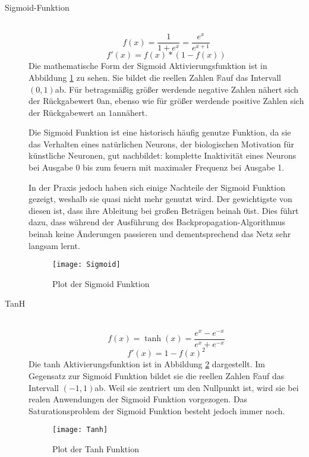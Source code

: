 \begin{description}
	\item[Sigmoid-Funktion] \hfill \\
		\begin{equation}
			f(x) = \frac{1}{1 + e^x} = \frac{e^x}{e^{x + 1}}
			\label{func:Sigmoid}
		\end{equation}
		\begin{equation}
			f'(x) = f(x) * (1 - f(x))
		\end{equation}
		Die mathematische Form der Sigmoid Aktivierungsfunktion ist in Abbildung \ref{sigmoidFunc} zu sehen.
		Sie bildet die reellen Zahlen \(\mathbb{R}\)auf das Intervall \((0,1)\)ab. 
		Für betragsmäßig größer werdende negative Zahlen nähert sich der Rückgabewert \(0\)an,
		ebenso wie für größer werdende positive Zahlen sich der Rückgabewert an \(1\)annähert.

		Die Sigmoid Funktion ist eine historisch häufig genutze Funktion, da sie das Verhalten eines natürlichen Neurons,
		der biologischen Motivation für künstliche Neuronen, gut nachbildet:
		komplette Inaktivität eines Neurons bei Ausgabe 0 bis zum feuern mit maximaler Frequenz bei Ausgabe 1.

		In der Praxis jedoch haben sich einige Nachteile der Sigmoid Funktion gezeigt, weshalb sie quasi nicht mehr genutzt wird.
		Der gewichtigste von diesen ist, dass ihre Ableitung bei großen Beträgen beinah \(0\)ist.
		Dies führt dazu, dass während der Ausführung des Backpropagation-Algorithmus beinah keine Änderungen passieren und dementsprechend das Netz sehr langsam lernt.
		
		\begin{figure}
			\centering
			\texttt{[image: Sigmoid]}
			\caption{Plot der Sigmoid Funktion}
			\label{sigmoidFunc}
		\end{figure}
		  


	\item[TanH] \hfill \\
		\begin{equation}
			f(x) = \tanh(x) = \frac{e^x - e^{-x}}{e^x + e^{-x}}
		\end{equation}
		\begin{equation}
			f'(x) = 1 - f(x)^2
		\end{equation}
		Die tanh Aktivierungsfunktion ist in Abbildung \ref{tanhfunction} dargestellt.
		Im Gegensatz zur Sigmoid Funktion bildet sie die reellen Zahlen \(\mathbb{R}\)auf das Intervall \((-1, 1)\)ab.
		Weil sie zentriert um den Nullpunkt ist, wird sie bei realen Anwendungen der Sigmoid Funktion vorgezogen.
		Das Saturationsproblem der Sigmoid Funktion besteht jedoch immer noch.
		\begin{figure}
			\centering
			\texttt{[image: Tanh]}
			\caption{Plot der Tanh Funktion}
			\label{tanhfunction}
		\end{figure}
	

\end{description}
